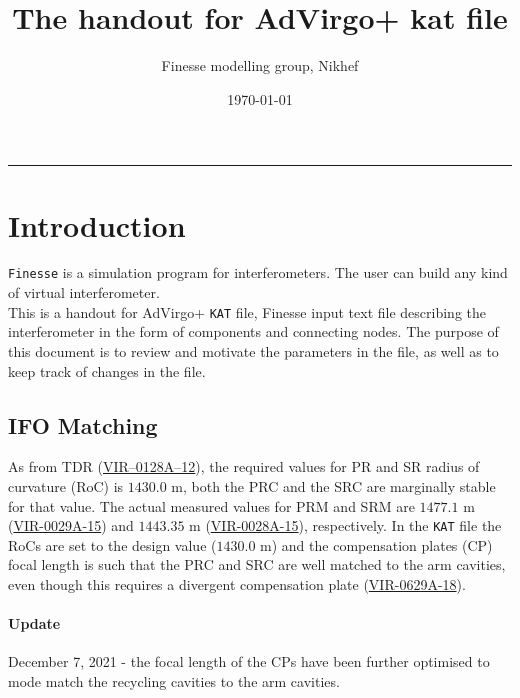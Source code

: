 \documentclass[color,DIV12,pdftex,a4paper]{virgo-note}
\title{The handout for AdVirgo+ kat file}
\author{Finesse modelling group, Nikhef}
\date{\today}
\begin{document}
\newcommand{\n}[0]{\newline}
\newcommand{\nrow}[0]{ & & \\}

\begin{titlepage}
\maketitle
\end{titlepage}
\clearpage

\tableofcontents
\vspace{1cm}
\hrule height 1pt
\vspace{1cm}

\section{Introduction}

\texttt{Finesse} is a simulation program for interferometers. The user can build any kind of virtual interferometer.\\
This is a handout for AdVirgo+ \texttt{KAT} file, Finesse input text file describing the interferometer in the form of components and connecting nodes. The purpose of this document is to review and motivate the parameters in the file, as well as to keep track of changes in the file.

\subsection{IFO Matching}
As from TDR (\href{https://tds.virgo-gw.eu/?content=3\&r=9317}{VIR–0128A–12}), the required values for PR and SR radius of curvature (RoC) is $1430.0$ m, both the PRC and the SRC are marginally stable for that value. The actual measured values for PRM and SRM are $1477.1$ m (\href{https://tds.virgo-gw.eu/?content=3\&r=11410}{VIR-0029A-15}) and $1443.35$ m (\href{https://tds.ego-gw.it/?content=3\&r=11409}{VIR-0028A-15}), respectively. In the \texttt{KAT} file the RoCs are set to the design value ($1430.0$ m) and the compensation plates (CP) focal length is such that the PRC and SRC are well matched to the arm cavities, even though this requires a divergent compensation plate (\href{https://tds.virgo-gw.eu/?content=3\&r=14682}{VIR-0629A-18}).

\paragraph{Update} December 7, 2021 - the focal length of the CPs have been further optimised to mode match the recycling cavities to the arm cavities.
\end{document}
